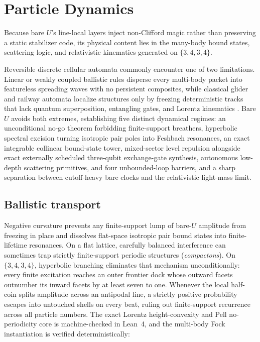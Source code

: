 \section{Particle Dynamics}
\label{sec:composites}

Because bare $U$'s line-local layers inject non-Clifford magic rather than preserving a static stabilizer code, its
physical content lies in the many-body bound states, scattering logic, and relativistic kinematics generated on
$\{3,4,3,4\}$.

Reversible discrete cellular automata commonly encounter one of two limitations. Linear or weakly coupled ballistic rules
disperse every multi-body packet into featureless spreading waves with no persistent composites, while classical glider
and railway automata localize structures only by freezing deterministic tracks that lack quantum superposition,
entangling gates, and Lorentz kinematics \cite{arrighi2019, farrelly2020}. Bare $U$ avoids both extremes, establishing
five distinct dynamical regimes: an unconditional no-go theorem forbidding finite-support breathers, hyperbolic spectral
excision turning isotropic pair poles into Feshbach resonances, an exact integrable collinear bound-state tower,
mixed-sector level repulsion alongside exact externally scheduled three-qubit exchange-gate synthesis, autonomous
low-depth scattering primitives, and four unbounded-loop barriers, and a sharp separation between cutoff-heavy bare
clocks and the relativistic light-mass limit.

\subsection{Ballistic transport}

Negative curvature prevents any finite-support lump of bare-$U$ amplitude from freezing in place and dissolves flat-space
isotropic pair bound states into finite-lifetime resonances. On a flat lattice, carefully balanced interference can
sometimes trap strictly finite-support periodic structures (\emph{compactons}). On $\{3,4,3,4\}$, hyperbolic branching
eliminates that mechanism unconditionally: every finite excitation reaches an outer frontier dock whose outward facets
outnumber its inward facets by at least seven to one. Whenever the local half-coin splits amplitude across an antipodal
line, a strictly positive probability escapes into untouched shells on every beat, ruling out finite-support recurrence
across all particle numbers. The exact Lorentz height-convexity and Pell no-periodicity core is machine-checked in
Lean~4, and the multi-body Fock instantiation is verified deterministically:

